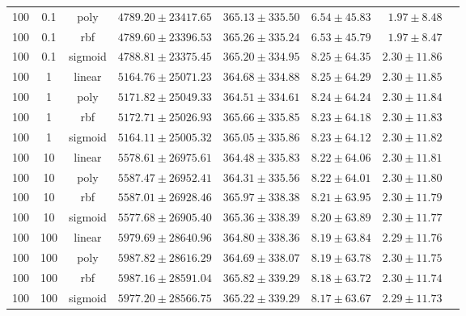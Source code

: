 \begin{tabular}{cccrrrrr}
100 & 0.1 & poly & $4789.20 \pm 23417.65$ & $365.13 \pm 335.50$ & $6.54 \pm 45.83$ & $1.97 \pm 8.48$\\
100 & 0.1 & rbf & $4789.60 \pm 23396.53$ & $365.26 \pm 335.24$ & $6.53 \pm 45.79$ & $1.97 \pm 8.47$\\
100 & 0.1 & sigmoid & $4788.81 \pm 23375.45$ & $365.20 \pm 334.95$ & $8.25 \pm 64.35$ & $2.30 \pm 11.86$\\
100 & 1 & linear & $5164.76 \pm 25071.23$ & $364.68 \pm 334.88$ & $8.25 \pm 64.29$ & $2.30 \pm 11.85$\\
100 & 1 & poly & $5171.82 \pm 25049.33$ & $364.51 \pm 334.61$ & $8.24 \pm 64.24$ & $2.30 \pm 11.84$\\
100 & 1 & rbf & $5172.71 \pm 25026.93$ & $365.66 \pm 335.85$ & $8.23 \pm 64.18$ & $2.30 \pm 11.83$\\
100 & 1 & sigmoid & $5164.11 \pm 25005.32$ & $365.05 \pm 335.86$ & $8.23 \pm 64.12$ & $2.30 \pm 11.82$\\
100 & 10 & linear & $5578.61 \pm 26975.61$ & $364.48 \pm 335.83$ & $8.22 \pm 64.06$ & $2.30 \pm 11.81$\\
100 & 10 & poly & $5587.47 \pm 26952.41$ & $364.31 \pm 335.56$ & $8.22 \pm 64.01$ & $2.30 \pm 11.80$\\
100 & 10 & rbf & $5587.01 \pm 26928.46$ & $365.97 \pm 338.38$ & $8.21 \pm 63.95$ & $2.30 \pm 11.79$\\
100 & 10 & sigmoid & $5577.68 \pm 26905.40$ & $365.36 \pm 338.39$ & $8.20 \pm 63.89$ & $2.30 \pm 11.77$\\
100 & 100 & linear & $5979.69 \pm 28640.96$ & $364.80 \pm 338.36$ & $8.19 \pm 63.84$ & $2.29 \pm 11.76$\\
100 & 100 & poly & $5987.82 \pm 28616.29$ & $364.69 \pm 338.07$ & $8.19 \pm 63.78$ & $2.30 \pm 11.75$\\
100 & 100 & rbf & $5987.16 \pm 28591.04$ & $365.82 \pm 339.29$ & $8.18 \pm 63.72$ & $2.30 \pm 11.74$\\
100 & 100 & sigmoid & $5977.20 \pm 28566.75$ & $365.22 \pm 339.29$ & $8.17 \pm 63.67$ & $2.29 \pm 11.73$\\
\bottomrule
\end{tabular}
